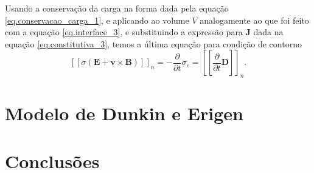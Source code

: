 Usando a conserva\c{c}\~ao da carga na forma dada pela equa\c{c}\~ao \ref{eq.conservacao_carga_1}, e aplicando ao volume $V$ analogamente ao que foi feito com a equa\c{c}\~ao \ref{eq.interface_3}, e substituindo a express\~ao para $\mathbf{J}$ dada na equa\c{c}\~ao \ref{eq.constitutiva_3}, temos a \'ultima equa\c{c}\~ao para condi\c{c}\~ao de contorno
\begin{equation*}
\left[\left[\sigma(\mathbf{E}+\mathbf{v}\times\mathbf{B})\right]\right]_n=-\frac{\partial}{\partial t}\sigma_e=\left[\left[\frac{\partial}{\partial t}\mathbf{D}\right]\right]_n.
\end{equation*}

\section{Modelo de Dunkin e Erigen}



\section{Conclus\~oes}